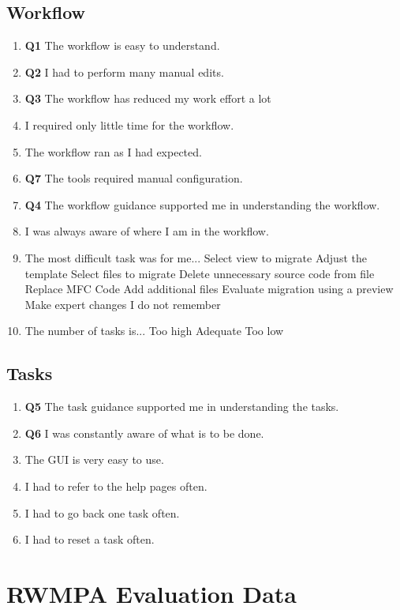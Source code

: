 \begin{appendix}
\subsection*{Workflow}
\begin{enumerate}
\item \textbf{Q1} The workflow is easy to understand.
\item \textbf{Q2} I had to perform many manual edits.
\item \textbf{Q3} The workflow has reduced my work effort a lot
\item I required only little time for the workflow.
\item The workflow ran as I had expected. 
\item \textbf{Q7} The tools required manual configuration.
\item \textbf{Q4} The workflow guidance supported me in understanding the workflow.
\item I was always aware of where I am in the workflow.
\item The most difficult task was for me...
\subitem Select view to migrate
\subitem Adjust the template
\subitem Select files to migrate
\subitem Delete unnecessary source code from file
\subitem Replace MFC Code
\subitem Add additional files
\subitem Evaluate migration using a preview
\subitem Make expert changes
\subitem I do not remember
\item The number of tasks is...
\subitem Too high
\subitem Adequate
\subitem Too low
\end{enumerate}

\subsection*{Tasks}
\begin{enumerate}
\item \textbf{Q5} The task guidance supported me in understanding the tasks.
\item \textbf{Q6} I was constantly aware of what is to be done.
\item The GUI is very easy to use.
\item I had to refer to the help pages often.
\item I had to go back one task often.
\item I had to reset a task often.
\end{enumerate}

\section{RWMPA Evaluation Data}
\vspace{15pt}


\end{appendix}
